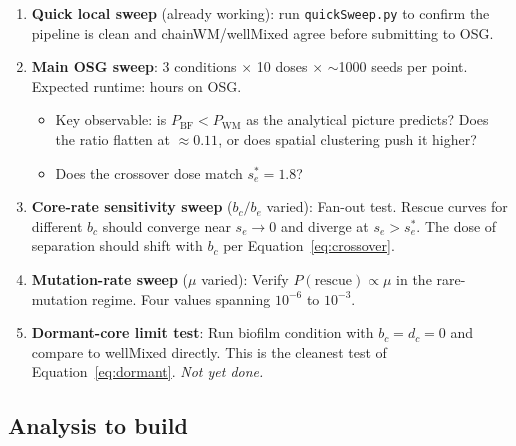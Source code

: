 \documentclass[12pt]{article}
\begin{document}
\begin{enumerate}
    \item \textbf{Quick local sweep} (already working): run
    \texttt{quickSweep.py} to confirm the pipeline is clean and
    chainWM/wellMixed agree before submitting to OSG.

    \item \textbf{Main OSG sweep}: 3 conditions $\times$ 10 doses $\times$
    $\sim$1000 seeds per point. Expected runtime: hours on OSG.
    \begin{itemize}
        \item Key observable: is $P_{\text{BF}} < P_{\text{WM}}$ as the
        analytical picture predicts? Does the ratio flatten at $\approx 0.11$,
        or does spatial clustering push it higher?
        \item Does the crossover dose match $s_e^* = 1.8$?
    \end{itemize}

    \item \textbf{Core-rate sensitivity sweep} ($b_c/b_e$ varied):
    Fan-out test. Rescue curves for different $b_c$ should converge near
    $s_e \to 0$ and diverge at $s_e > s_e^*$. The dose of separation
    should shift with $b_c$ per Equation~\eqref{eq:crossover}.

    \item \textbf{Mutation-rate sweep} ($\mu$ varied): Verify $P(\text{rescue})
    \propto \mu$ in the rare-mutation regime. Four values spanning
    $10^{-6}$ to $10^{-3}$.

    \item \textbf{Dormant-core limit test}: Run biofilm condition with
    $b_c = d_c = 0$ and compare to wellMixed directly. This is the
    cleanest test of Equation~\eqref{eq:dormant}. \emph{Not yet done.}
\end{enumerate}

\subsection{Analysis to build}
\end{document}
